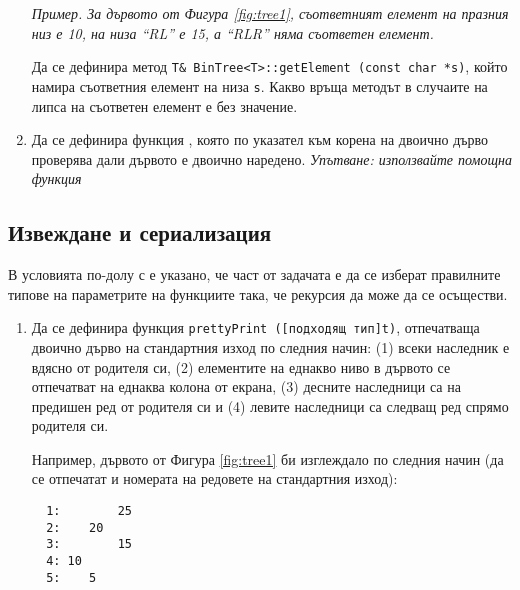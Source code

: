 \begin{enumerate}[]
	\textit{Пример. За 	дървото от Фигура \ref{fig:tree1}, съответният елемент на празния низ е 10, на низа ``RL'' е 15, а ``RLR'' няма съответен елемент.}

	Да се дефинира метод \texttt{T\& BinTree<T>::getElement (const char *s)}, който намира съответния елемент на низа \texttt{s}. Какво връща методът в случаите на липса на съответен елемент е без значение.

  \item Да се дефинира функция , която по указател към корена на двоично дърво проверява дали дървото е двоично наредено. \emph{Упътване: използвайте помощна функция}


\end{enumerate}

\subsection {Извеждане и сериализация}

\begin{mdframed}[hidealllines=true,backgroundcolor=gray!20]
  В условията по-долу с  е указано, че част от задачата е да се изберат правилните типове на параметрите на функциите така, че рекурсия да може да се осъществи.
\end{mdframed}
  
\begin{enumerate}[resume]

  \item Да се дефинира функция \texttt{prettyPrint ([подходящ тип]t)}, отпечатваща двоично дърво на стандартния изход по следния начин: (1) всеки наследник е вдясно от родителя си, (2) елементите на еднакво ниво в дървото се отпечатват на еднаква колона от екрана, (3) десните наследници са на предишен ред от родителя си и (4) левите наследници са следващ ред спрямо родителя си.

  Например, дървото от Фигура \ref{fig:tree1} би изглеждало по следния начин (да се отпечатат и номерата на редовете на стандартния изход):

  \begin{verbatim}
  1:        25
  2:    20
  3:        15
  4: 10
  5:    5
  \end{verbatim}

\end{enumerate}


